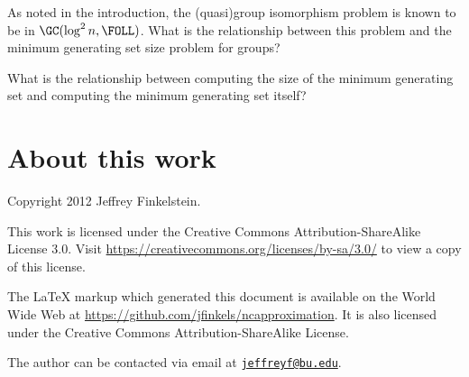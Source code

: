 \documentclass{article}
\newcommand{\email}[1]{\href{mailto:#1}{\nolinkurl{#1}}}
\begin{document}
As noted in the introduction, the (quasi)group isomorphism problem is known to be in $\GC(\log^2 n, \FOLL)$.
What is the relationship between this problem and the minimum generating set size problem for groups?

What is the relationship between computing the size of the minimum generating set and computing the minimum generating set itself?

\section{About this work}

Copyright 2012 Jef{}frey Finkelstein.

This work is licensed under the Creative Commons Attribution-ShareAlike License 3.0.
Visit \mbox{\url{https://creativecommons.org/licenses/by-sa/3.0/}} to view a copy of this license.

The \LaTeX{} markup which generated this document is available on the World Wide Web at \mbox{\url{https://github.com/jfinkels/ncapproximation}}.
It is also licensed under the Creative Commons Attribution-ShareAlike License.

The author can be contacted via email at \email{jeffreyf@bu.edu}.



\end{document}
